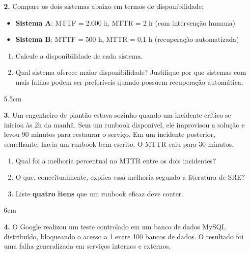 \documentclass[12pt,a4paper,twoside]{report}
\begin{document}
\textbf{2.} Compare os dois sistemas abaixo em termos de disponibilidade:

\begin{itemize}
  \item \textbf{Sistema A}: MTTF = 2.000 h, MTTR = 2 h (com intervenção humana)
  \item \textbf{Sistema B}: MTTF = 500 h, MTTR = 0,1 h (recuperação automatizada)
\end{itemize}

\begin{enumerate}[label=\alph*)]
  \item Calcule a disponibilidade de cada sistema.
  \item Qual sistema oferece maior disponibilidade? Justifique por que sistemas com
        mais falhas podem ser preferíveis quando possuem recuperação automática.
\end{enumerate}
\begin{resposta}{5.5cm}
\end{resposta}

\vspace{0.5cm}

\textbf{3.} Um engenheiro de plantão estava sozinho quando um incidente crítico se iniciou às
2h da manhã. Sem um runbook disponível, ele improvisou a solução e levou 90 minutos
para restaurar o serviço. Em um incidente posterior, semelhante, havia um runbook bem
escrito. O MTTR caiu para 30 minutos.

\begin{enumerate}[label=\alph*)]
  \item Qual foi a melhoria percentual no MTTR entre os dois incidentes?
  \item O que, conceitualmente, explica essa melhoria segundo a literatura de SRE?
  \item Liste \textbf{quatro itens} que um runbook eficaz deve conter.
\end{enumerate}
\begin{resposta}{6cm}
\end{resposta}

\vspace{0.5cm}

\textbf{4.} O Google realizou um teste controlado em um banco de dados MySQL distribuído,
bloqueando o acesso a 1 entre 100 bancos de dados. O resultado foi uma falha generalizada
em serviços internos e externos.
\end{document}
